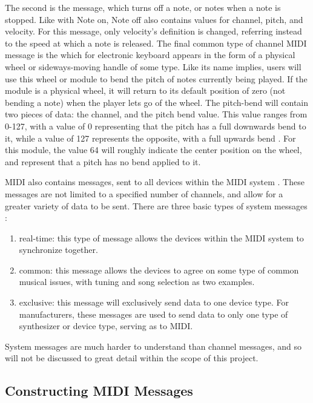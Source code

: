 The second is the  message, which turns off a note, or notes when a note is stopped. Like with Note on, Note off also contains values for channel, pitch, and velocity. For this message, only velocity's definition is changed, referring instead to the speed at which a note is released. The final common type of channel MIDI message is the  which for electronic keyboard appears in the form of a physical wheel or sideways-moving handle of some type. Like its name implies, users will use this wheel or module to bend the pitch of notes currently being played. If the module is a physical wheel, it will return to its default position of zero (not bending a note) when the player lets go of the wheel. The pitch-bend will contain two pieces of data: the channel, and the pitch bend value. This value ranges from 0-127, with a value of 0 representing that the pitch has a full downwards bend to it, while a value of 127 represents the opposite, with a full upwards bend \cite{Kirk_Hunt_2013}. For this module, the value 64 will roughly indicate the center position on the wheel, and represent that a pitch has no bend applied to it.

MIDI also contains  messages, sent to all devices within the MIDI system \cite{Romano_2003}. These messages are not limited to a specified number of channels, and allow for a greater variety of data to be sent. There are three basic types of system messages \cite{Kirk_Hunt_2013}:

\begin{enumerate}
	\item real-time: this type of message allows the devices within the MIDI system to synchronize together.
	\item common: this message allows the devices to agree on some type of common musical issues, with tuning and song selection as two examples.
	\item exclusive: this message will exclusively send data to one device type. For manufacturers, these messages are used to send data to only one type of synthesizer or device type, serving as  to MIDI.
\end{enumerate}

\noindent System messages are much harder to understand than channel messages, and so will not be discussed to great detail within the scope of this project.

\subsection[Constructing MIDI Messages]{Constructing MIDI Messages}\label{section:midi-messages}

